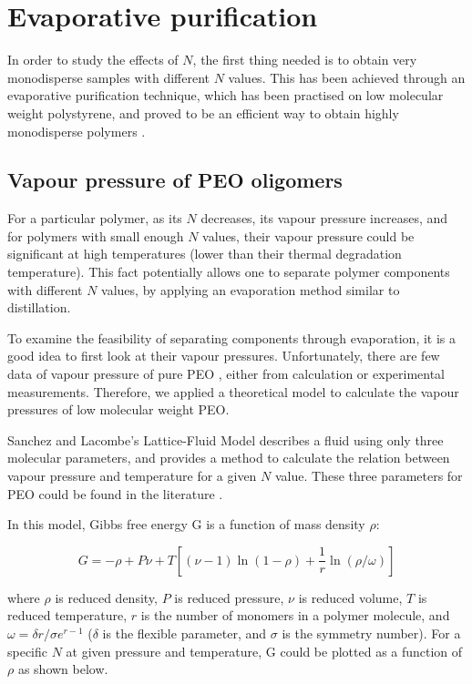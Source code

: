 \chapter{Evaporative purification}
\graphicspath{{./evaporation/graphs/}}

In order to study the effects of $N$, the first thing needed is to obtain very monodisperse samples with different $N$ values. This has been achieved through an evaporative purification technique, which has been practised on low molecular weight polystyrene, and proved to be an efficient way to obtain highly monodisperse polymers \cite{Zhu2017a}.

\section{Vapour pressure of PEO oligomers}

For a particular polymer, as its $N$ decreases, its vapour pressure increases, and for polymers with small enough $N$ values, their vapour pressure could be significant at high temperatures (lower than their thermal degradation temperature). This fact potentially allows one to separate polymer components with different $N$ values, by applying an evaporation method similar to distillation.

To examine the feasibility of separating components through evaporation, it is a good idea to first look at their vapour pressures. Unfortunately, there are few data of vapour pressure of pure PEO \cite{Krieger2018}, either from calculation or experimental measurements. Therefore, we applied a theoretical model to calculate the vapour pressures of low molecular weight PEO.

Sanchez and Lacombe's Lattice-Fluid Model \cite{Sanchez1976} describes a fluid using only three molecular parameters, and provides a method to calculate the relation between vapour pressure and temperature for a given $N$ value. These three parameters for PEO could be found in the literature \cite{Rodgers1993}.

In this model, Gibbs free energy G is a function of mass density $\rho$:

\begin{equation}
G = - \rho + P\nu + T[(\nu - 1)\ln(1 - \rho) + \dfrac{1}{r}\ln(\rho/\omega)]  \label{eqn_Gvsrho}
\end{equation}

\noindent
where $\rho$ is reduced density, $P$ is reduced pressure, $\nu$ is reduced volume, $T$ is reduced temperature, $r$ is the number of monomers in a polymer molecule, and $\omega = \delta r/\sigma e^{r-1}$ ($\delta$ is the flexible parameter, and $\sigma$ is the symmetry number). For a specific $N$ at given pressure and temperature, G could be plotted as a function of $\rho$ as shown below.

